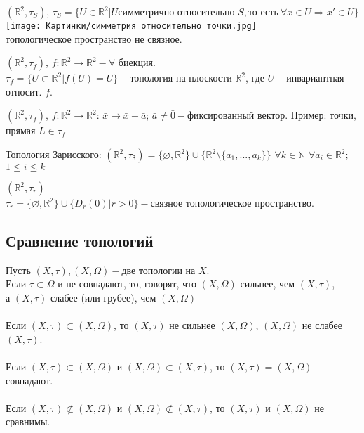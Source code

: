 \begin{example}
$(\mathbb{R}^2,\tau_{S})$,
$\tau_{S}=\{U{\in}\mathbb{R}^2|U\text{симметрично относительно } S, \text{то есть}\ \forall x{\in}U \Rightarrow x'{\in}U\}$\\
\texttt{[image: Картинки/симметрия относительно точки.jpg]}\\ топологическое пространство не связное.
\end{example}

\begin{example}
$(\mathbb{R}^2,\tau_{f})$, $f: \mathbb{R}^2\to\mathbb{R}^2-\forall$ биекция.\\
$\tau_f=\{U{\subset}\mathbb{R}^2|f(U)=U\}-$топология на плоскости $\mathbb{R}^2$, где $U-$инвариантная относит. $f$.
\end{example}

\begin{example}
$(\mathbb{R}^2,\tau_{f})$, $f:\mathbb{R}^2\to\mathbb{R}^2$: $\bar{x}\mapsto \bar{x}+\bar{a}$; $\bar{a}{\neq}\bar{0}-$фиксированный вектор. Пример: точки, прямая $L{\in}\tau_f$
\end{example}

\begin{example}
Топология Зарисского: $(\mathbb{R}^2,\tau_{\text{З}})=\{\varnothing,\mathbb{R}^2\}{\cup}\{\mathbb{R}^2\setminus\{a_1,...,a_k\}\}$ $\forall k{\in}\mathbb{N}$ $\forall a_i{\in}\mathbb{R}^2$; $1{\leq}i{\leq}k$
\end{example}

\begin{example}
$(\mathbb{R}^2,\tau_{r})$\\
$\tau_r=\{\varnothing,\mathbb{R}^2\}{\cup}\{D_r(0)|r>0\}-$связное топологическое пространство.
\end{example}

\subsection{Сравнение топологий}
\begin{definition}
Пусть $(X,\tau),(X,\Omega)-$две топологии на $X$.\\
Если $\tau{\subset}\Omega$ и не совпадают, то, говорят, что $(X,\Omega)$ сильнее, чем $(X,\tau)$,\\ а $(X,\tau)$ слабее (или грубее), чем $(X,\Omega)$\\ \\
Если $(X,\tau){\subset}(X,\Omega)$, то $(X,\tau)$ не сильнее $(X,\Omega)$, $(X,\Omega)$ не слабее $(X,\tau)$.\\ \\
Если $(X,\tau){\subset}(X,\Omega)$ и $(X,\Omega)\subset(X,\tau)$, то $(X,\tau)=(X,\Omega)$ - совпадают.\\ \\
Если $(X,\tau){\not\subset}(X,\Omega)$ и $(X,\Omega){\not\subset}(X,\tau)$, то $(X,\tau)$ и $(X,\Omega)$ не сравнимы.
\end{definition}

